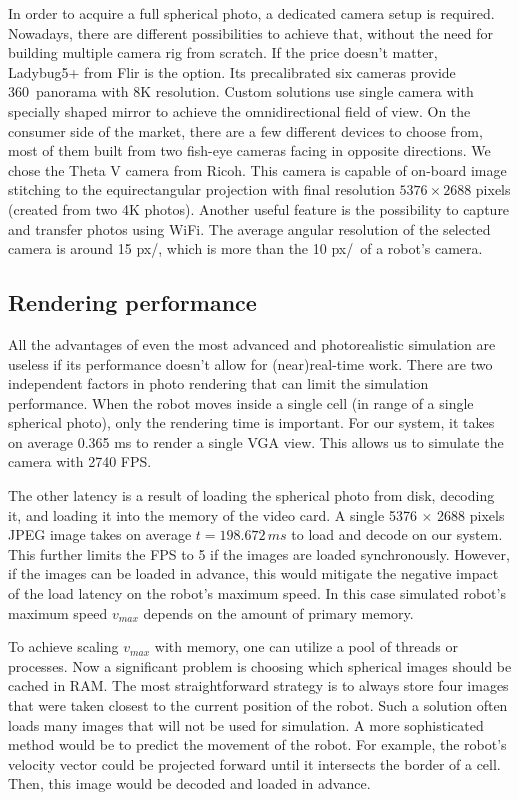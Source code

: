 \documentclass{svproc}
\begin{document}
In order to acquire a full spherical photo, a dedicated camera setup is required. Nowadays, there are different 
possibilities to achieve that, without the need for building multiple camera rig from scratch. If the price 
doesn't matter, Ladybug5+ from Flir is the option. Its precalibrated six cameras provide 360\textdegree\ 
panorama with 8K resolution. Custom solutions use single camera with specially shaped mirror \cite{wkasik2017embedded}
to achieve the omnidirectional field of view. On the consumer side of the market, there are a few different devices to choose from,
most of them built from two fish-eye cameras facing in opposite directions. We chose the Theta V camera from Ricoh. 
This camera is capable of on-board image stitching to the equirectangular projection with final resolution
$5376\times2688$ pixels (created from two 4K photos). Another useful feature is the possibility to capture
and transfer photos using WiFi. The average angular resolution of the selected camera is around 15 px/\textdegree, 
which is more than the 10 px/\textdegree\ of a robot's camera. 

\subsection{Rendering performance}

All the advantages of even the most advanced and photorealistic simulation are useless if its performance 
doesn't allow for (near)real-time work. There are two independent factors in photo rendering that can limit
the simulation performance. When the robot moves inside a single cell (in range of a single spherical
photo), only the rendering time is important. For our system, it takes on average 0.365 ms to
render a single VGA view. This allows us to simulate the camera with 2740 FPS.

The other latency is a result of loading the spherical photo from disk, decoding it, and loading it into the memory of the video card.
A single 5376 $\times$ 2688 pixels JPEG image takes on average $t = 198.672\,ms$ to load and decode on our system.
This further limits the FPS to 5 if the images are loaded synchronously.
However, if the images can be loaded in advance, this would mitigate the negative impact of the load latency on the robot's maximum speed.
In this case simulated robot's maximum speed $v_{max}$ depends on the amount of primary memory.

To achieve scaling $v_{max}$ with memory, one can utilize a pool of threads or processes.
Now a significant problem is choosing which spherical images should be cached in RAM.
The most straightforward strategy is to always store four images that were taken closest to the current position of the robot.
Such a solution often loads many images that will not be used for simulation.
A more sophisticated method would be to predict the movement of the robot.
For example, the robot's velocity vector could be projected forward until it intersects the border of a cell.
Then, this image would be decoded and loaded in advance.
\end{document}
